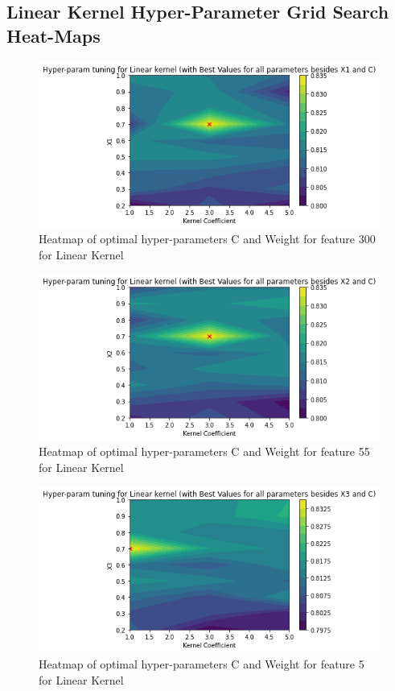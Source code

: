 \subsection{Linear Kernel Hyper-Parameter Grid Search Heat-Maps}
\begin{figure}[h!]
    \includegraphics[width=\textwidth]{figures/final/linear_x1.png}
    \caption{\label{fig:lin_300} Heatmap of optimal hyper-parameters C and Weight for feature 300 for Linear Kernel}
\end{figure}
\begin{figure}[h!]
    \includegraphics[width=\textwidth]{figures/final/linear_x2.png}
    \caption{\label{fig:lin_55} Heatmap of optimal hyper-parameters C and Weight for feature 55 for Linear Kernel}
\end{figure}
\begin{figure}[h!]
    \includegraphics[width=\textwidth]{figures/final/linear_x3.png}
    \caption{\label{fig:lin_5} Heatmap of optimal hyper-parameters C and Weight for feature 5 for Linear Kernel}
\end{figure}
